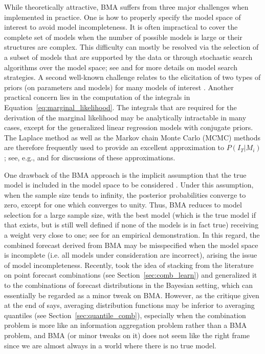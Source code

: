\documentclass[a4paper,11pt]{article}
\begin{document}
While theoretically attractive, BMA suffers from three major challenges when implemented in practice. One is how to properly specify the model space of interest to avoid model incompleteness. It is often impractical to cover the complete set of models when the number of possible models is large or their structures are complex. This difficulty can mostly be resolved via the selection of a subset of models that are supported by the data or through stochastic search algorithms over the model space; see \citet{Hoeting1999-qn} and \citet{Koop2003-nl} for more details on model search strategies. A second well-known challenge relates to the elicitation of two types of priors (on parameters and models) for many models of interest \citep{Moral-Benito2015-zh,Aastveit2019-lf}. Another practical concern lies in the computation of the integrals in Equation~\eqref{eq:marginal_likelihood}. The integrals that are required for the derivation of the marginal likelihood may be analytically intractable in many cases, except for the generalized linear regression models with conjugate priors. The Laplace method as well as the Markov chain Monte Carlo (MCMC) methods are therefore frequently used to provide an excellent approximation to $P(I_{T}|M_{i})$; see, e.g., \citet{Hoeting1999-qn} and \citet{Bassetti2020-uh} for discussions of these approximations.

One drawback of the BMA approach is the implicit assumption that the true model is included in the model space to be considered \citep{Wright2008-bs}. Under this assumption, when the sample size tends to infinity, the posterior probabilities converge to zero, except for one which converges to unity. Thus, BMA reduces to model selection for a large sample size, with the best model (which is the true model if that exists, but is still well defined if none of the models is in fact true) receiving a weight very close to one; see \citet{Geweke2010-zn} for an empirical demonstration. In this regard, the combined forecast derived from BMA may be misspecified when the model space is incomplete (i.e. all models under consideration are incorrect), arising the issue of model incompleteness. Recently, \citet{Yao2018-st} took the idea of stacking from the literature on point forecast combinations (see Section~\ref{sec:comb_learn}) and generalized it to the combinations of forecast distributions in the Bayesian setting, which can essentially be regarded as a minor tweak on BMA. However, as the critique given at the end of \citet{Yao2018-st} says, averaging distribution functions may be inferior to averaging quantiles (see Section~\ref{sec:quantile_comb}), especially when the combination problem is more like an information aggregation problem rather than a BMA problem, and BMA (or minor tweaks on it) does not seem like the right frame since we are almost always in a world where there is no true model.
\end{document}
